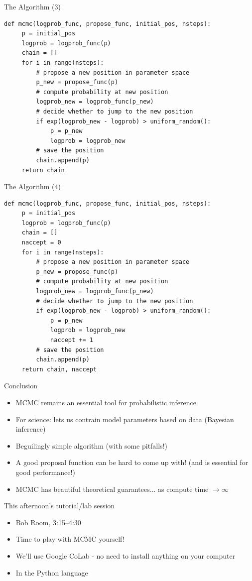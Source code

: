 \documentclass{beamer}
\newcommand{\dfmpage}[1]{
{
\setbeamercolor{background canvas}{bg=}

}
}
\begin{document}
\begin{frame}[fragile]{The Algorithm (3)}
\begin{small}
\begin{verbatim}
def mcmc(logprob_func, propose_func, initial_pos, nsteps):
     p = initial_pos
     logprob = logprob_func(p)
     chain = []
     for i in range(nsteps):
         # propose a new position in parameter space
         p_new = propose_func(p)
         # compute probability at new position
         logprob_new = logprob_func(p_new)
         # decide whether to jump to the new position
         if exp(logprob_new - logprob) > uniform_random():
             p = p_new
             logprob = logprob_new
         # save the position
         chain.append(p)
     return chain
\end{verbatim}
\end{small}
\end{frame}

\begin{frame}[fragile]{The Algorithm (4)}
\begin{small}
\begin{verbatim}
def mcmc(logprob_func, propose_func, initial_pos, nsteps):
     p = initial_pos
     logprob = logprob_func(p)
     chain = []
     naccept = 0
     for i in range(nsteps):
         # propose a new position in parameter space
         p_new = propose_func(p)
         # compute probability at new position
         logprob_new = logprob_func(p_new)
         # decide whether to jump to the new position
         if exp(logprob_new - logprob) > uniform_random():
             p = p_new
             logprob = logprob_new
             naccept += 1
         # save the position
         chain.append(p)
     return chain, naccept
\end{verbatim}
\end{small}
\end{frame}


\begin{frame}{Conclusion}
\begin{itemize}
\item MCMC remains an essential tool for probabilistic inference
\item For science: lets us contrain model parameters based on data (Bayesian inference)
\item Beguilingly simple algorithm (with some pitfalls!)
\item A good proposal function can be hard to come up with! (and is essential for good performance!)
\item MCMC has beautiful theoretical guarantees... as compute time $\to \infty$
\end{itemize}
\end{frame}



\begin{frame}{This afternoon's tutorial/lab session}
\begin{itemize}
\item Bob Room, 3:15--4:30
\item Time to play with MCMC yourself!
\item We'll use Google CoLab - no need to install anything on your computer
\item In the Python language
\end{itemize}
\end{frame}



\dfmpage{46-54}
\end{document}
